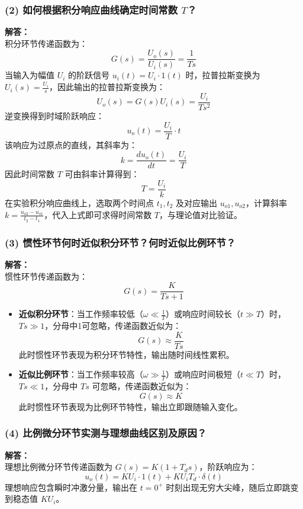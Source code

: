 \documentclass[12pt,a4paper,UTF8]{article}
\begin{document}
\subsubsection*{(2) 如何根据积分响应曲线确定时间常数 $T$？}
\textbf{解答：}\\
积分环节传递函数为：
\[
G(s) = \frac{U_o(s)}{U_i(s)} = \frac{1}{Ts}
\]
当输入为幅值 $U_i$ 的阶跃信号 $u_i(t) = U_i \cdot 1(t)$ 时，拉普拉斯变换为 $U_i(s) = \frac{U_i}{s}$，因此输出的拉普拉斯变换为：
\[
U_o(s) = G(s)U_i(s) = \frac{U_i}{Ts^2}
\]
逆变换得到时域阶跃响应：
\[
u_o(t) = \frac{U_i}{T} \cdot t
\]
该响应为过原点的直线，其斜率为：
\[
k = \frac{du_o(t)}{dt} = \frac{U_i}{T}
\]
因此时间常数 $T$ 可由斜率计算得到：
\[
T = \frac{U_i}{k}
\]
在实验积分响应曲线上，选取两个时间点 $t_1, t_2$ 及对应输出 $u_{o1}, u_{o2}$，计算斜率 $k = \frac{u_{o2}-u_{o1}}{t_2-t_1}$，代入上式即可求得时间常数 $T$，与理论值对比验证。

\subsubsection*{(3) 惯性环节何时近似积分环节？何时近似比例环节？}
\textbf{解答：}\\
惯性环节传递函数为：
\[
G(s) = \frac{K}{Ts+1}
\]
\begin{itemize}
\item \textbf{近似积分环节}：当工作频率较低（$\omega \ll \frac{1}{T}$）或响应时间较长（$t \gg T$）时，$Ts \gg 1$，分母中1可忽略，传递函数近似为：
  \[
  G(s) \approx \frac{K}{Ts}
  \]
  此时惯性环节表现为积分环节特性，输出随时间线性累积。
\item \textbf{近似比例环节}：当工作频率较高（$\omega \gg \frac{1}{T}$）或响应时间极短（$t \ll T$）时，$Ts \ll 1$，分母中 $Ts$ 可忽略，传递函数近似为：
  \[
  G(s) \approx K
  \]
  此时惯性环节表现为比例环节特性，输出立即跟随输入变化。
\end{itemize}

\subsubsection*{(4) 比例微分环节实测与理想曲线区别及原因？}
\textbf{解答：}\\
理想比例微分环节传递函数为 $G(s) = K(1+T_d s)$，阶跃响应为：
\[
u_o(t) = KU_i \cdot 1(t) + KU_i T_d \cdot \delta(t)
\]
理想响应包含瞬时冲激分量，输出在 $t=0^+$ 时刻出现无穷大尖峰，随后立即跳变到稳态值 $KU_i$。
\end{document}
